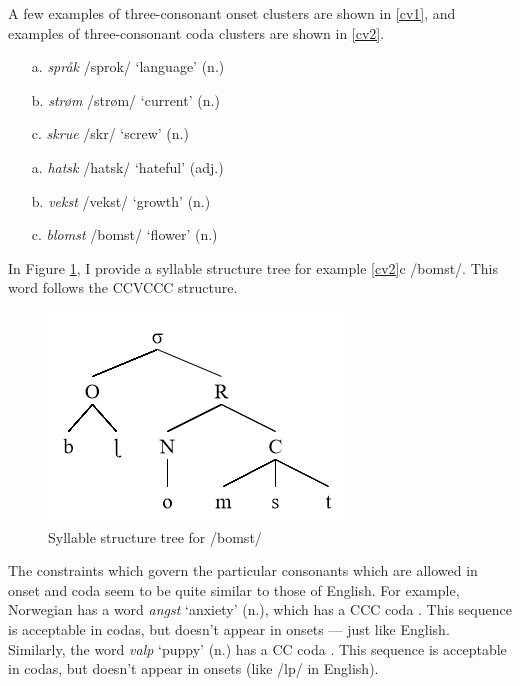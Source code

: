 \documentclass{article}
\begin{document}
A few examples of three-consonant onset clusters are shown in \ref{cv1}, and examples of three-consonant coda clusters are shown in \ref{cv2}. \cite{TheGermanicLanguages}

\begin{exe}
    \ex
    \label{cv1}
    \begin{itemize}
        \item [a.] \textit{språk} /sprok/ `language' (n.)
        \item [b.] \textit{strøm} /strøm/ `current' (n.)
        \item [c.] \textit{skrue} /skr\textbaru\textschwa/ `screw' (n.)
    \end{itemize}
\end{exe}
\newpage
\begin{exe}
    \ex
    \label{cv2}
    \begin{itemize}
        \item [a.] \textit{hatsk} /hatsk/ `hateful' (adj.)
        \item [b.] \textit{vekst} /vekst/ `growth' (n.)
        \item [c.] \textit{blomst} /b\textrtaill omst/ `flower' (n.)
    \end{itemize}
\end{exe}

In Figure \ref{blomst}, I provide a syllable structure tree for example \ref{cv2}c /b\textrtaill omst/. This word follows the CCVCCC structure.

\begin{figure}[h]
    \centering
    \includegraphics[scale=.6]{images/blomst.PNG}
    \caption{Syllable structure tree for /b\textrtaill omst/}
    \label{blomst}
\end{figure}

The constraints which govern the particular consonants which are allowed in onset and coda seem to be quite similar to those of English. For example, Norwegian has a word \textit{angst}  `anxiety' (n.), which has a CCC coda . This sequence is acceptable in codas, but doesn't appear in onsets — just like English. Similarly, the word \textit{valp}  `puppy' (n.) has a CC coda . This sequence is acceptable in codas, but doesn't appear in onsets (like /lp/ in English).
\end{document}
